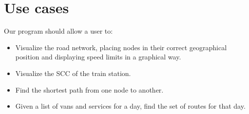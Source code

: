 \chapter{Use cases} \label{use-cases}
Our program should allow a user to:
\begin{itemize}
    \item Visualize the road network, placing nodes in their correct geographical position and displaying speed limits in a graphical way.
    \item Visualize the \acrshort{SCC} of the train station.
    \item Find the shortest path from one node to another.
    \item Given a list of vans and services for a day, find the set of routes for that day.
\end{itemize}
